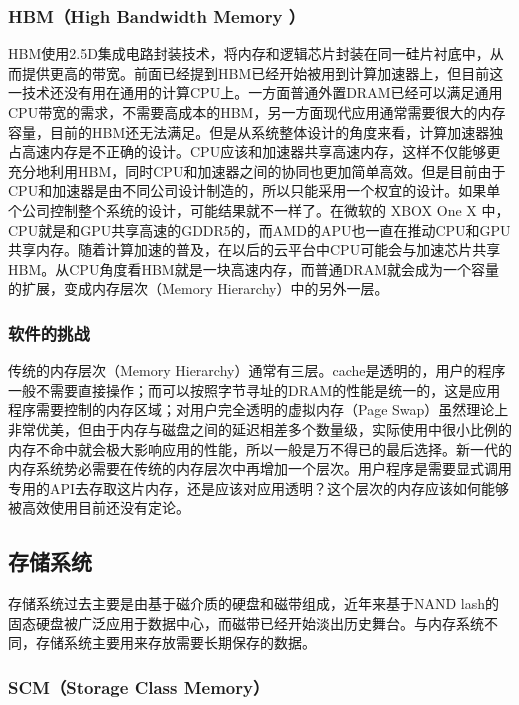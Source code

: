 \subsubsection{HBM（High Bandwidth Memory ）}

HBM使用2.5D集成电路封装技术，将内存和逻辑芯片封装在同一硅片衬底中，从而提供更高的带宽。前面已经提到HBM已经开始被用到计算加速器上，但目前这一技术还没有用在通用的计算CPU上。一方面普通外置DRAM已经可以满足通用CPU带宽的需求，不需要高成本的HBM，另一方面现代应用通常需要很大的内存容量，目前的HBM还无法满足。但是从系统整体设计的角度来看，计算加速器独占高速内存是不正确的设计。CPU应该和加速器共享高速内存，这样不仅能够更充分地利用HBM，同时CPU和加速器之间的协同也更加简单高效。但是目前由于CPU和加速器是由不同公司设计制造的，所以只能采用一个权宜的设计。如果单个公司控制整个系统的设计，可能结果就不一样了。在微软的 XBOX One X 中，CPU就是和GPU共享高速的GDDR5的，而AMD的APU也一直在推动CPU和GPU共享内存。随着计算加速的普及，在以后的云平台中CPU可能会与加速芯片共享HBM。从CPU角度看HBM就是一块高速内存，而普通DRAM就会成为一个容量的扩展，变成内存层次（Memory Hierarchy）中的另外一层。

\subsubsection{软件的挑战}

传统的内存层次（Memory Hierarchy）通常有三层。cache是透明的，用户的程序一般不需要直接操作；而可以按照字节寻址的DRAM的性能是统一的，这是应用程序需要控制的内存区域；对用户完全透明的虚拟内存（Page Swap）虽然理论上非常优美，但由于内存与磁盘之间的延迟相差多个数量级，实际使用中很小比例的内存不命中就会极大影响应用的性能，所以一般是万不得已的最后选择。新一代的内存系统势必需要在传统的内存层次中再增加一个层次。用户程序是需要显式调用专用的API去存取这片内存，还是应该对应用透明？这个层次的内存应该如何能够被高效使用目前还没有定论。

\subsection{存储系统}

存储系统过去主要是由基于磁介质的硬盘和磁带组成，近年来基于NAND lash的固态硬盘被广泛应用于数据中心，而磁带已经开始淡出历史舞台。与内存系统不同，存储系统主要用来存放需要长期保存的数据。

\subsubsection{SCM（Storage Class Memory）}

